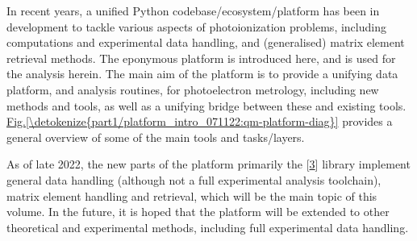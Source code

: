 \documentclass[letterpaper,10pt,english]{jupyterBook}
\begin{document}
\sphinxAtStartPar
In recent years, a unified Python codebase/ecosystem/platform has been in development to tackle various aspects of photoionization problems, including  computations and experimental data handling, and (generalised) matrix element retrieval methods. The eponymous  platform is introduced here, and is used for the analysis herein. The main aim of the platform is to provide a unifying data platform, and analysis routines, for photoelectron metrology, including new methods and tools, as well as a unifying bridge between these and existing tools. \hyperref[\detokenize{part1/platform_intro_071122:qm-platform-diag}]{Fig.\@ \ref{\detokenize{part1/platform_intro_071122:qm-platform-diag}}} provides a general overview of some of the main tools and tasks/layers.

\sphinxAtStartPar
As of late 2022, the new parts of the platform \sphinxhyphen{} primarily the  {[}\hyperlink{cite.backmatter/bibliography:id57}{3}{]} library \sphinxhyphen{} implement general data handling (although not a full experimental analysis toolchain), matrix element handling and retrieval, which will be the main topic of this volume.
In the future, it is hoped that the platform will be extended to other theoretical and experimental methods, including full experimental data handling.
\end{document}
